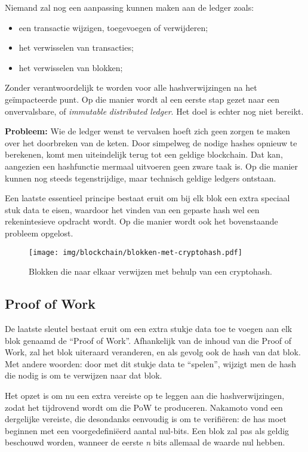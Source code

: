 Niemand zal nog een aanpassing kunnen maken aan de ledger zoals:
\begin{itemize}
	\item een transactie wijzigen, toegevoegen of verwijderen;
	\item het verwisselen van transacties;
	\item het verwisselen van blokken;
\end{itemize}

Zonder verantwoordelijk te worden voor alle hashverwijzingen na het geïmpacteerde punt. Op die manier wordt al een eerste stap gezet naar een onvervalsbare, of \textit{immutable} \textit{distributed ledger}. Het doel is echter nog niet bereikt.

\textbf{Probleem:} Wie de ledger wenst te vervalsen hoeft zich geen zorgen te maken over het doorbreken van de keten. 
Door simpelweg de nodige hashes opnieuw te berekenen, komt men uiteindelijk terug tot een geldige blockchain. Dat kan, aangezien een hashfunctie mermaal uitvoeren geen zware taak is. Op die manier kunnen nog steeds tegenstrijdige, maar technisch geldige ledgers ontstaan.

Een laatste essentieel principe bestaat eruit om bij elk blok een extra speciaal stuk data te eisen, waardoor het vinden van een gepaste hash wel een rekenintesieve opdracht wordt. Op die manier wordt ook het bovenstaande probleem opgelost.

\begin{figure}[H]
	\centering
	\texttt{[image: img/blockchain/blokken-met-cryptohash.pdf]}
	\caption{\label{fig:blokken-met-cryptohash}Blokken die naar elkaar verwijzen met behulp van een cryptohash.}
\end{figure}

\subsection{Proof of Work}
\label{sub:proof-of-work}

De laatste sleutel bestaat eruit om een extra stukje data toe te voegen aan elk blok genaamd de ``Proof of Work''.
Afhankelijk van de inhoud van die Proof of Work, zal het blok uiteraard veranderen, en als gevolg ook de hash van dat blok. Met andere woorden: door met dit stukje data te ``spelen'', wijzigt men de hash die nodig is om te verwijzen naar dat blok.

Het opzet is om nu een extra vereiste op te leggen aan die hashverwijzingen, zodat het tijdrovend wordt om die PoW te produceren. Nakamoto vond een dergelijke vereiste, die desondanks eenvoudig is om te verifiëren: de has moet beginnen met een voorgedefiniëerd aantal nul-bits. Een blok zal pas als geldig beschouwd worden, wanneer de eerste \textit{n} bits allemaal de waarde nul hebben. 

